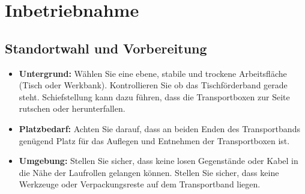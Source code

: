 %
%

\chapter{Inbetriebnahme}

\section{Standortwahl und Vorbereitung}

\begin{itemize}
	\item \textbf{Untergrund:} Wählen Sie eine ebene, stabile und trockene Arbeitsfläche (Tisch oder Werkbank). Kontrollieren Sie ob das Tischförderband gerade steht. Schiefstellung kann dazu führen, dass die Transportboxen zur Seite rutschen oder herunterfallen.
	
	\item \textbf{Platzbedarf:} Achten Sie darauf, dass an beiden Enden des Transportbands genügend Platz für das Auflegen und Entnehmen der Transportboxen ist.
	
	\item \textbf{Umgebung:} Stellen Sie sicher, dass keine losen Gegenstände oder Kabel in die Nähe der Laufrollen gelangen können. Stellen Sie sicher, dass keine Werkzeuge oder Verpackungsreste auf dem Transportband liegen.

\end{itemize}


	
	
	
